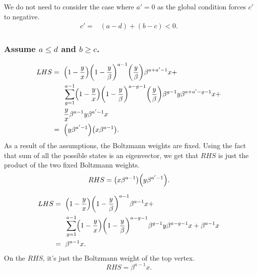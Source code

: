 \documentclass[ALCO, Unicode]{cedram}
\DeclarePairedDelimiter\autobracket{(}{)}
\newcommand{\br}[1]{\autobracket*{#1}}
\begin{document}
We do not need to consider the case where $a'=0$ as the global condition forces $c'$ to negative.
\begin{align*}
c'=&(a-d)+(b-c)<0.
\end{align*}


\subsubsection{Assume \texorpdfstring{$a\leq d$ and $b\geq c$}{a<=d and b>=c}.}

{\allowdisplaybreaks
\begin{align*}
LHS=\text{ }& \br{1-\dfrac{y}{x}}\br{1-\dfrac{y}{\beta}}^{a-1}\br{\dfrac{y}{\beta            }}\beta^{a+a'-1}x+\\
           &\sum^{a-1}_{g=1}\br{1-\dfrac{y}{x}}\br{1-\dfrac{y}{\beta}}^{a-g-1}\br{\dfrac{y}{\beta}} \beta^{g-1}y \beta^{a+a'-g-1}x+\\
           &\dfrac{y}{x}\beta^{a-1}y\beta^{a'-1}x\\
           =\text{ }& \br{y\beta^{a'-1}}\br{x\beta^{a-1}}.
\end{align*}
}
As a result of the assumptions, the Boltzmann weights are fixed. 
Using the fact that sum of all the possible states is an eigenvector, we get that $RHS$ is just the product of the two fixed Boltzmann weights.
\[
RHS=\br{x\beta^{a-1}} \br{y\beta^{a'-1}}.
\]

{
\allowdisplaybreaks
\begin{align*}
LHS=\text{ }& \br{1-\dfrac{y}{x}}\br{1-\dfrac{y}{\beta}}^{a-1}\beta^{a-1}x+\\
            &\sum^{a-1}_{g=1}\br{1-\dfrac{y}{x}}\br{1-\dfrac{y}{\beta}}^{a-g-1} \beta^{g-1}y \beta^{a-g-1}x+\beta^{a-1}x\\
   =\text{ }&  \beta^{a-1}x.     
\end{align*}
}
On the $RHS$, it's just the Boltzmann weight of the top vertex.
\[
RHS=\beta^{a-1}x.
\]
\end{document}

